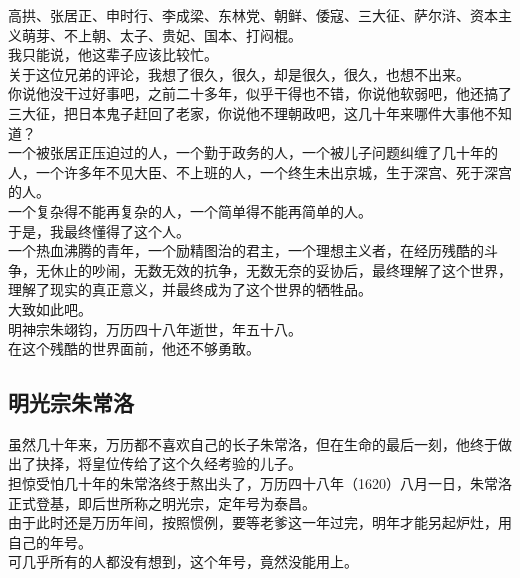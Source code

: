 \begin{multicols}{\theparacolNo}
高拱、张居正、申时行、李成梁、东林党、朝鲜、倭寇、三大征、萨尔浒、资本主义萌芽、不上朝、太子、贵妃、国本、打闷棍。\\

我只能说，他这辈子应该比较忙。\\

关于这位兄弟的评论，我想了很久，很久，却是很久，很久，也想不出来。\\

你说他没干过好事吧，之前二十多年，似乎干得也不错，你说他软弱吧，他还搞了三大征，把日本鬼子赶回了老家，你说他不理朝政吧，这几十年来哪件大事他不知道？\\

一个被张居正压迫过的人，一个勤于政务的人，一个被儿子问题纠缠了几十年的人，一个许多年不见大臣、不上班的人，一个终生未出京城，生于深宫、死于深宫的人。\\

一个复杂得不能再复杂的人，一个简单得不能再简单的人。\\

于是，我最终懂得了这个人。\\

一个热血沸腾的青年，一个励精图治的君主，一个理想主义者，在经历残酷的斗争，无休止的吵闹，无数无效的抗争，无数无奈的妥协后，最终理解了这个世界，理解了现实的真正意义，并最终成为了这个世界的牺牲品。\\

大致如此吧。\\

明神宗朱翊钧，万历四十八年逝世，年五十八。\\

在这个残酷的世界面前，他还不够勇敢。\\

\subsection{明光宗朱常洛}
虽然几十年来，万历都不喜欢自己的长子朱常洛，但在生命的最后一刻，他终于做出了抉择，将皇位传给了这个久经考验的儿子。\\

担惊受怕几十年的朱常洛终于熬出头了，万历四十八年（1620）八月一日，朱常洛正式登基，即后世所称之明光宗，定年号为泰昌。\\

由于此时还是万历年间，按照惯例，要等老爹这一年过完，明年才能另起炉灶，用自己的年号。\\

可几乎所有的人都没有想到，这个年号，竟然没能用上。\\


\end{multicols}
